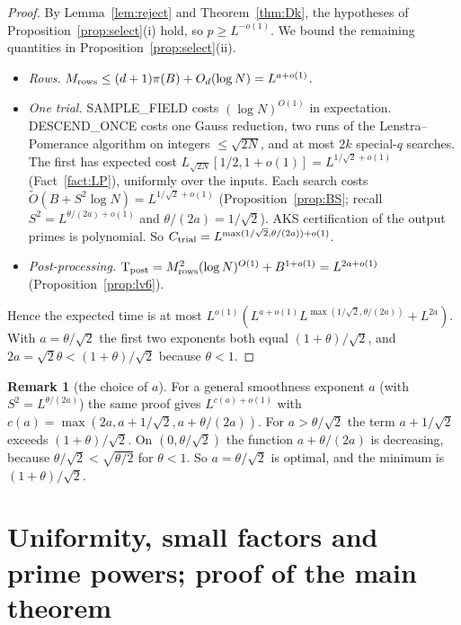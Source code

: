 \documentclass[11pt]{amsart}
\theoremstyle{definition}
\newtheorem{remark}[theorem]{Remark}
\begin{document}
\begin{proof}
By Lemma~\ref{lem:reject} and Theorem~\ref{thm:Dk}, the hypotheses of Proposition~\ref{prop:select}(i) hold, so $p\ge L^{-o(1)}$. We bound the
remaining quantities in Proposition~\ref{prop:select}(ii).
\begin{itemize}
\item \emph{Rows.} $M_{\rm rows}\le(d+1)\pi(B)+O_d(\log N)=L^{a+o(1)}$.
\item \emph{One trial.} SAMPLE\_FIELD costs $(\log N)^{O(1)}$ in expectation. DESCEND\_ONCE costs one Gauss reduction, two runs of the
  Lenstra--Pomerance algorithm on integers $\le\sqrt{2N}$, and at most $2k$ special-$q$ searches. The first has expected cost
  $L_{\sqrt{2N}}[1/2,1+o(1)]=L^{1/\sqrt2+o(1)}$ (Fact~\ref{fact:LP}), uniformly over the inputs. Each search costs $\tilde O(B+S^2\log N)=L^{1/\sqrt2+o(1)}$
  (Proposition~\ref{prop:BS}; recall $S^2=L^{\theta/(2a)+o(1)}$ and $\theta/(2a)=1/\sqrt2$). AKS certification of the output primes is
  polynomial. So $C_{\rm trial}=L^{\max(1/\sqrt2,\theta/(2a))+o(1)}$.
\item \emph{Post-processing.} $\mathrm T_{\rm post}=M_{\rm rows}^2(\log N)^{O(1)}+B^{1+o(1)}=L^{2a+o(1)}$ (Proposition~\ref{prop:lv6}).
\end{itemize}
Hence the expected time is at most $L^{o(1)}(L^{a+o(1)}L^{\max(1/\sqrt2,\theta/(2a))}+L^{2a})$. With $a=\theta/\sqrt2$ the first two exponents
both equal $(1+\theta)/\sqrt2$, and $2a=\sqrt2\theta<(1+\theta)/\sqrt2$ because $\theta<1$.
\end{proof}

\begin{remark}[the choice of $a$]
For a general smoothness exponent $a$ (with $S^2=L^{\theta/(2a)}$) the same proof gives $L^{c(a)+o(1)}$ with
$c(a)=\max(2a,a+1/\sqrt2,a+\theta/(2a))$. For $a>\theta/\sqrt2$ the term $a+1/\sqrt2$ exceeds $(1+\theta)/\sqrt2$. On $(0,\theta/\sqrt2)$ the function
$a+\theta/(2a)$ is decreasing, because $\theta/\sqrt2<\sqrt{\theta/2}$ for $\theta<1$. So $a=\theta/\sqrt2$ is optimal, and the minimum is $(1+\theta)/\sqrt2$.
\end{remark}

\section{Uniformity, small factors and prime powers; proof of the main theorem}\label{sec:uniform}
\end{document}
